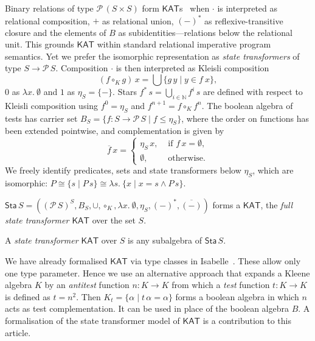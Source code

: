 \documentclass[envcountsame]{llncs}
\newcommand{\KAT}{\mathsf{KAT}}
\newcommand{\Pow}{\mathcal{P}}
\newcommand{\sta}{\mathsf{Sta}}
\begin{document}
Binary relations of type $\Pow\, (S\times S)$ form
$\KAT$s~\cite{Kozen97} when $\cdot$ is interpreted as relational
composition, $+$ as relational union, $(-)^\ast$ as
reflexive-transitive closure and the elements of $B$ as
subidentities---relations below the relational unit. This grounds
$\KAT$ within standard relational imperative program semantics. Yet we
prefer the isomorphic representation as \emph{state transformers} of
type $S\to \Pow\, S$.  Composition $\cdot$ is then interpreted as
Kleisli composition
\begin{equation*} 
(f\circ_K g)\, x = \bigcup\{g\, y\mid y \in f\ x \}, 
\end{equation*} 
$0$ as $\lambda x.\ \emptyset$ and $1$ as $\eta_S = \{-\}$.  Stars
$f^{\ast}\, s  = \bigcup_{i\in\mathbb{N}} f^i\, s$ are defined with
  respect to Kleisli composition using $f^{0} = \eta_S$ and
  $f^{n+1} = f \circ_K f^{n}$. The boolean algebra of tests has
  carrier set $B_S=\{f:S\to \Pow\, S \mid f\le \eta_S\}$, where the
  order on functions has been extended pointwise,  and complementation
  is given by
  \begin{equation*} 
    \overline{f}\, x =
  \begin{cases}
    \eta_S\, x, & \text{ if } f\, x = \emptyset,\\
\emptyset, & \text{ otherwise}.
  \end{cases}
\end{equation*}
We freely identify predicates, sets and state 
transformers below $\eta_S$, which are isomorphic:
$P\cong \{s\mid P\, s\}\cong \lambda s.\ \{x\mid x=s \land P\, s\}$.

\begin{proposition}\label{P:kleisli-ka}
$\sta\, S = ((\Pow\, S)^S,B_S,\cup,\circ_K,\lambda x.\
  \emptyset, \eta_S,(-)^{\ast},\overline{(-)})$
  forms a $\KAT$, the \emph{full state transformer $\KAT$} over the
  set $S$.
\end{proposition}
A \emph{state transformer $\KAT$} over $S$ is any subalgebra of
$\sta\, S$. 

We have already formalised $\KAT$ via type classes in
Isabelle~\cite{afp:kat}.  These allow only one type parameter. Hence
we use an alternative approach that expands a Kleene algebra $K$ by an
\emph{antitest} function $n:K\to K$ from which a \emph{test} function
$t:K\to K$ is defined as $t=n^2$. Then
$K_t = \{\alpha \mid t\, \alpha = \alpha\}$ forms a boolean algebra in
which $n$ acts as test complementation. It can be used in place of the
boolean algebra $B$.  A formalisation of the state transformer model
of $\KAT$ is a contribution to this article.
\end{document}
